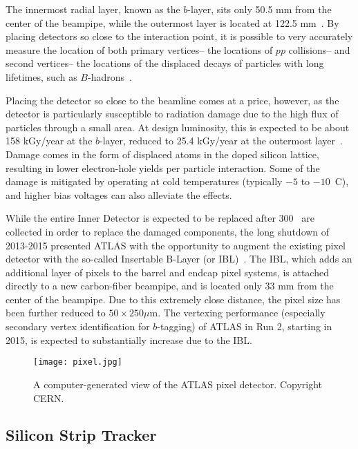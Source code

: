 The innermost radial layer, known as the $b$-layer, sits only 50.5 mm from the center of the beampipe, while the outermost layer is located at 122.5 mm~\cite{ATLASPaper}. By placing detectors so close to the interaction point, it is possible to very accurately measure the location of both  primary vertices-- the locations of $pp$ collisions-- and second vertices-- the locations of the displaced decays of particles with long lifetimes, such as $B$-hadrons~\cite{ATLASExpected}.

Placing the detector so close to the beamline comes at a price, however, as the detector is particularly susceptible to radiation damage due to the high flux of particles through a small area. At design luminosity, this is expected to be about 158 kGy/year at the $b$-layer, reduced to 25.4 kGy/year at the outermost layer~\cite{ATLASPaper}. Damage comes in the form of displaced atoms in the doped silicon lattice, resulting in lower electron-hole yields per particle interaction. Some of the damage is mitigated by operating at cold temperatures (typically $-5$ to $-10$\degree~C), and higher bias voltages can also alleviate the effects.

While the entire Inner Detector is expected to be replaced after 300 \ifb~are collected in order to replace the damaged components, the long shutdown of 2013-2015 presented ATLAS with the opportunity to augment the existing pixel detector with the so-called Insertable B-Layer (or IBL)~\cite{ATLASIBL}. The IBL, which adds an additional layer of pixels to the barrel and endcap pixel systems, is attached directly to a new carbon-fiber beampipe, and is located only 33 mm from the center of the beampipe. Due to this extremely close distance, the pixel size has been further reduced to $50 \times 250 \mu$m. The vertexing performance (especially secondary vertex identification for $b$-tagging) of ATLAS in Run 2, starting in 2015, is expected to substantially increase due to the IBL. 


\begin{figure}
\centering
\texttt{[image: pixel.jpg]}
\label{fig:detector:pixel}
\caption{A computer-generated view of the ATLAS pixel detector. Copyright CERN.}
\end{figure}




\subsection{Silicon Strip Tracker}

